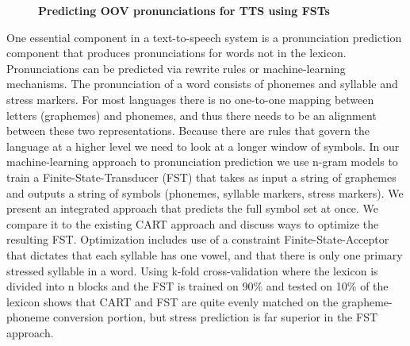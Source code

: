 \documentclass[10pt, a4paper, twopage, headinclude, footinclude, BCOR5mm]{book}
\begin{document}
\newpage

\begin{figure}[t!]
\centering
\large\textbf{Predicting OOV pronunciations for TTS using FSTs}
\vspace*{0.5cm}
\end{figure}


\begin{table}[t!]
\end{table} 
\noindent
One essential component in a text-to-speech system is a pronunciation prediction component that produces pronunciations for words not in the lexicon. Pronunciations can be predicted via rewrite rules or machine-learning mechanisms. The pronunciation of a word consists of phonemes and syllable and stress markers. For most languages there is no one-to-one mapping between letters (graphemes) and phonemes, and thus there needs to be an alignment between these two representations. Because there are rules that govern the language at a higher level we need to look at a longer window of symbols. In our machine-learning approach to pronunciation prediction we use n-gram models to train a Finite-State-Transducer (FST) that takes as input a string of graphemes and outputs a string of symbols (phonemes, syllable markers, stress markers). We present an integrated approach that predicts the full symbol set at once. We compare it to the existing CART approach and discuss ways to optimize the resulting FST. Optimization includes use of a constraint Finite-State-Acceptor that dictates that each syllable has one vowel, and that there is only one primary stressed syllable in a word. Using k-fold cross-validation where the lexicon is divided into n blocks and the FST is trained on 90\% and tested on 10\% of the lexicon shows that CART and FST are quite evenly matched on the grapheme-phoneme conversion portion, but stress prediction is far superior in the FST approach.   
\end{document}

